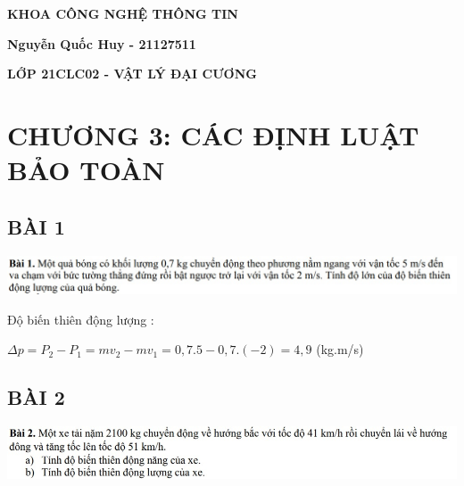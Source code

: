\documentclass[12pt,a4paper]{article}
\begin{document}
\thispagestyle{empty}
\begin{LARGE}
    \begin{center}{\underline{\color{red}{\bf NATIONAL UNIVERSITY OF HO CHI MINH CITY}}}
    \end{center}
\end{LARGE}
\vspace*{1cm}
\begin{center}{\Huge \color{green}\textbf{KHOA CÔNG NGHỆ THÔNG TIN}}
\end{center}
\vspace*{15cm}
\begin{center}{\Huge \color{cyan}\textbf{Nguyễn Quốc Huy - 21127511}}
\end{center}
\vspace*{1cm}
\begin{center}
    {\Huge \color{cyan}\textbf{{LỚP 21CLC02 - VẬT LÝ ĐẠI CƯƠNG}}}
\end{center}
\newpage
\let\cleardoublepage\clearpage

\tableofcontents

\newpage
\section{\textbf{\color{red}CHƯƠNG 3: CÁC ĐỊNH LUẬT BẢO TOÀN}}
\Large \subsection{\color{blue}\textbf{BÀI 1} }

\vspace*{1cm}
\includegraphics[scale=0.80]{No1.jpg}

\vspace*{1cm}
Độ biến thiên động lượng : 

$\Delta p = P_2 - P_1 = mv_2 - mv_1 = 0,7.5 - 0,7.(-2) = 4,9$ (kg.m/s)
\Large \subsection{\color{blue}\textbf{BÀI 2} }

\vspace*{1cm}
\includegraphics[scale=0.80]{No2.jpg}
\end{document}
